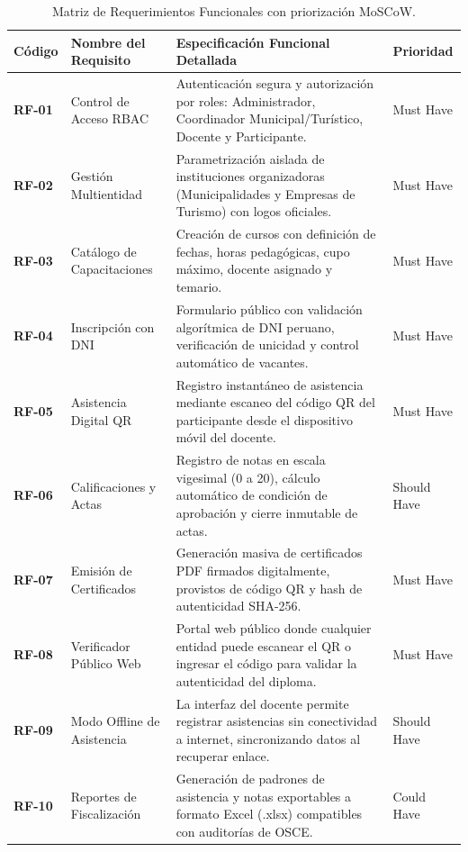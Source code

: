 \documentclass[11pt,a4paper]{article}
\begin{document}
\begin{table}[H]
\centering
\small
\renewcommand{\arraystretch}{1.2}
\begin{tabularx}{\textwidth}{P{1.3cm}P{4.0cm}YP{2.2cm}}
\toprule
\textbf{Código} & \textbf{Nombre del Requisito} & \textbf{Especificación Funcional Detallada} & \textbf{Prioridad} \\
\midrule
\textbf{RF-01} & Control de Acceso RBAC & Autenticación segura y autorización por roles: Administrador, Coordinador Municipal/Turístico, Docente y Participante. & Must Have \\
\midrule
\textbf{RF-02} & Gestión Multientidad & Parametrización aislada de instituciones organizadoras (Municipalidades y Empresas de Turismo) con logos oficiales. & Must Have \\
\midrule
\textbf{RF-03} & Catálogo de Capacitaciones & Creación de cursos con definición de fechas, horas pedagógicas, cupo máximo, docente asignado y temario. & Must Have \\
\midrule
\textbf{RF-04} & Inscripción con DNI & Formulario público con validación algorítmica de DNI peruano, verificación de unicidad y control automático de vacantes. & Must Have \\
\midrule
\textbf{RF-05} & Asistencia Digital QR & Registro instantáneo de asistencia mediante escaneo del código QR del participante desde el dispositivo móvil del docente. & Must Have \\
\midrule
\textbf{RF-06} & Calificaciones y Actas & Registro de notas en escala vigesimal (0 a 20), cálculo automático de condición de aprobación y cierre inmutable de actas. & Should Have \\
\midrule
\textbf{RF-07} & Emisión de Certificados & Generación masiva de certificados PDF firmados digitalmente, provistos de código QR y hash de autenticidad SHA-256. & Must Have \\
\midrule
\textbf{RF-08} & Verificador Público Web & Portal web público donde cualquier entidad puede escanear el QR o ingresar el código para validar la autenticidad del diploma. & Must Have \\
\midrule
\textbf{RF-09} & Modo Offline de Asistencia & La interfaz del docente permite registrar asistencias sin conectividad a internet, sincronizando datos al recuperar enlace. & Should Have \\
\midrule
\textbf{RF-10} & Reportes de Fiscalización & Generación de padrones de asistencia y notas exportables a formato Excel (.xlsx) compatibles con auditorías de OSCE. & Could Have \\
\bottomrule
\end{tabularx}
\caption{Matriz de Requerimientos Funcionales con priorización MoSCoW.}
\label{tab:rf}
\end{table}
\end{document}

